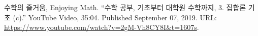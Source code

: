 \documentclass[11pt,openany]{article}
\begin{document}
%	


\begin{thebibliography}{9}
	수학의 즐거움, Enjoying Math. ``수학 공부, 기초부터 대학원 수학까지, 3. 집합론 기초 (c).'' YouTube Video, 35:04. Published 
	September 07, 2019. URL: \url{https://www.youtube.com/watch?v=2gM-Vh8CY8I&t=1607s}.
\end{thebibliography}
\end{document}
